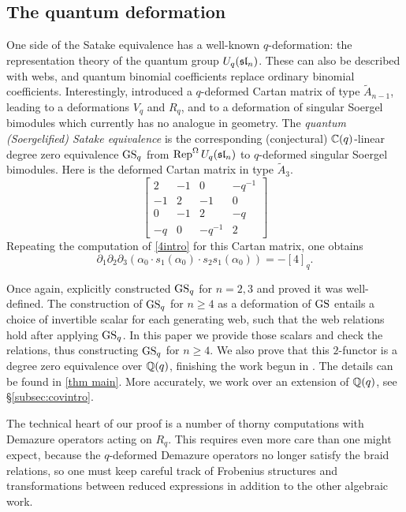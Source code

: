 \subsection{The quantum deformation}

One side of the Satake equivalence has a well-known $q$-deformation: the representation theory of the quantum group $U_q(\mathfrak{sl}_n)$. These can also be described with webs, and quantum binomial coefficients replace ordinary binomial coefficients. Interestingly, \cite{EQuantumI} introduced a $q$-deformed Cartan matrix of type $\tilde{A}_{n-1}$, leading to a deformations $V_q$ and $R_q$, and to a deformation of singular Soergel bimodules which currently has no analogue in geometry. The \emph{quantum (Soergelified) Satake equivalence} is the corresponding (conjectural) $\mathbb{C}(q)$-linear degree zero equivalence $\operatorname{GS}_q$ from $\operatorname{Rep}^{\Omega} U_q(\mathfrak{sl}_n)$ to $q$-deformed singular Soergel bimodules. Here is the deformed Cartan matrix in type $\tilde{A}_3$.
\begin{equation} \label{eq:deformedq} \begin{bmatrix}
    2 &-1 &0 & -q^{-1} \\
    -1 &2 &-1 &0\\
    0 &-1 &2 &-q \\
    -q & 0&-q^{-1} &2
\end{bmatrix} \end{equation}
Repeating the computation of \eqref{4intro} for this Cartan matrix, one obtains
\begin{equation} \label{q4intro} \partial_1 \partial_2 \partial_3 \left(\alpha_0 \cdot s_1(\alpha_0) \cdot s_2 s_1(\alpha_0) \right) = -[4]_q. \end{equation}

Once again, \cite{EQuantumI} explicitly constructed $\operatorname{GS}_q$ for $n=2,3$ and proved it was well-defined. The construction of $\operatorname{GS}_q$ for $n \ge 4$ as a deformation of $\operatorname{GS}$ entails a choice of invertible scalar for each generating web, such that the web relations hold after applying $\operatorname{GS}_q$. In this paper we provide those scalars and check the relations, thus constructing $\operatorname{GS}_q$ for $n \ge 4$. We also prove that this $2$-functor is a degree zero equivalence over $\mathbb{Q}(q)$, finishing the work begun in \cite{EQuantumI}. The details can be found in \cref{thm main}. More accurately, we work over an extension of $\mathbb{Q}(q)$, see \S\ref{subsec:covintro}.

The technical heart of our proof is a number of thorny computations with Demazure operators acting on $R_q$. This requires even more care than one might expect, because the $q$-deformed Demazure operators no longer satisfy the braid relations, so one must keep careful track of Frobenius structures and transformations between reduced expressions in addition to the other algebraic work.

